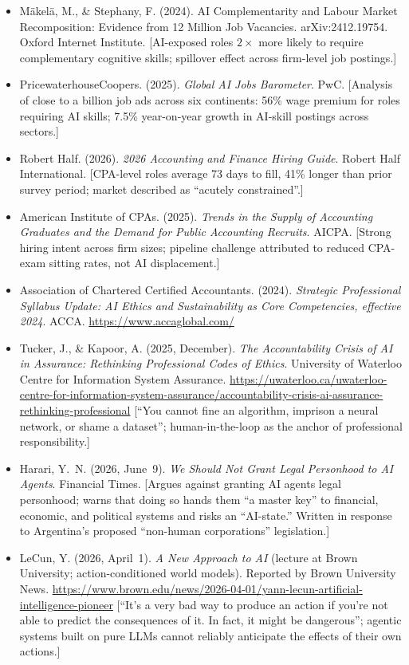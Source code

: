 \documentclass[12pt]{clapps}  %
\begin{document}
\begin{itemize}
    \item Mäkelä, M., \& Stephany, F. (2024). AI Complementarity and Labour Market Recomposition: Evidence from 12 Million Job Vacancies. arXiv:2412.19754. Oxford Internet Institute. [AI-exposed roles $2\times$ more likely to require complementary cognitive skills; spillover effect across firm-level job postings.]
    \item PricewaterhouseCoopers. (2025). \textit{Global AI Jobs Barometer}. PwC. [Analysis of close to a billion job ads across six continents: 56\% wage premium for roles requiring AI skills; 7.5\% year-on-year growth in AI-skill postings across sectors.]
    \item Robert Half. (2026). \textit{2026 Accounting and Finance Hiring Guide}. Robert Half International. [CPA-level roles average 73 days to fill, 41\% longer than prior survey period; market described as ``acutely constrained''.]
    \item American Institute of CPAs. (2025). \textit{Trends in the Supply of Accounting Graduates and the Demand for Public Accounting Recruits}. AICPA. [Strong hiring intent across firm sizes; pipeline challenge attributed to reduced CPA-exam sitting rates, not AI displacement.]
    \item Association of Chartered Certified Accountants. (2024). \textit{Strategic Professional Syllabus Update: AI Ethics and Sustainability as Core Competencies, effective 2024}. ACCA. \url{https://www.accaglobal.com/}
    \item Tucker, J., \& Kapoor, A. (2025, December). \textit{The Accountability Crisis of AI in Assurance: Rethinking Professional Codes of Ethics}. University of Waterloo Centre for Information System Assurance. \url{https://uwaterloo.ca/uwaterloo-centre-for-information-system-assurance/accountability-crisis-ai-assurance-rethinking-professional} [``You cannot fine an algorithm, imprison a neural network, or shame a dataset''; human-in-the-loop as the anchor of professional responsibility.]
    \item Harari, Y.~N. (2026, June~9). \textit{We Should Not Grant Legal Personhood to AI Agents}. Financial Times. [Argues against granting AI agents legal personhood; warns that doing so hands them ``a master key'' to financial, economic, and political systems and risks an ``AI-state.'' Written in response to Argentina's proposed ``non-human corporations'' legislation.]
    \item LeCun, Y. (2026, April~1). \textit{A New Approach to AI} (lecture at Brown University; action-conditioned world models). Reported by Brown University News. \url{https://www.brown.edu/news/2026-04-01/yann-lecun-artificial-intelligence-pioneer} [``It's a very bad way to produce an action if you're not able to predict the consequences of it. In fact, it might be dangerous''; agentic systems built on pure LLMs cannot reliably anticipate the effects of their own actions.]

\end{itemize}
\end{document}
